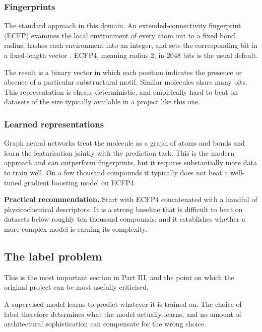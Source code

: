 \documentclass[11pt,a4paper]{article}
\begin{document}
\subsubsection{Fingerprints}

The standard approach in this domain. An extended-connectivity fingerprint
(ECFP) examines the local environment of every atom out to a fixed bond radius,
hashes each environment into an integer, and sets the corresponding bit in a
fixed-length vector \cite{rogers2010}. ECFP4, meaning radius 2, in 2048 bits is
the usual default.

The result is a binary vector in which each position indicates the presence or
absence of a particular substructural motif. Similar molecules share many bits.
This representation is cheap, deterministic, and empirically hard to beat on
datasets of the size typically available in a project like this one.

\subsubsection{Learned representations}

Graph neural networks treat the molecule as a graph of atoms and bonds and learn
the featurisation jointly with the prediction task. This is the modern approach
and can outperform fingerprints, but it requires substantially more data to
train well. On a few thousand compounds it typically does not beat a
well-tuned gradient boosting model on ECFP4.

\begin{keybox}
\textbf{Practical recommendation.} Start with ECFP4 concatenated with a
handful of physicochemical descriptors. It is a strong baseline that is
difficult to beat on datasets below roughly ten thousand compounds, and it
establishes whether a more complex model is earning its complexity.
\end{keybox}

\subsection{The label problem}

This is the most important section in Part III, and the point on which the
original project can be most usefully criticised.

A supervised model learns to predict whatever it is trained on. The choice of
label therefore determines what the model actually learns, and no amount of
architectural sophistication can compensate for the wrong choice.
\end{document}
